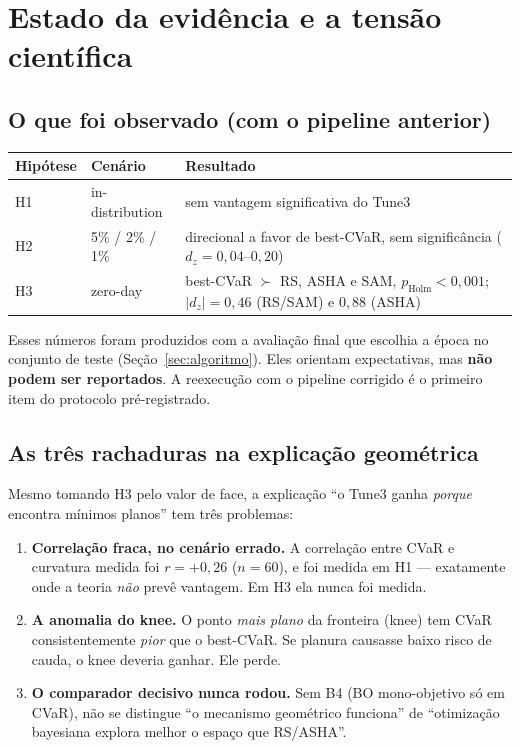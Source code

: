 \section{Estado da evidência e a tensão científica}\label{sec:evidencia}

\subsection{O que foi observado (com o pipeline anterior)}
\begin{center}\small
\begin{tabular}{@{}llp{8.2cm}@{}}
\toprule
Hipótese & Cenário & Resultado \\ \midrule
H1 & in-distribution & sem vantagem significativa do Tune3 \\
H2 & 5\% / 2\% / 1\% & direcional a favor de best-CVaR, sem significância ($d_z=0{,}04$--$0{,}20$) \\
H3 & zero-day & best-CVaR $\succ$ RS, ASHA e SAM, $p_{\text{Holm}}<0{,}001$; $|d_z|=0{,}46$ (RS/SAM) e $0{,}88$ (ASHA) \\
\bottomrule
\end{tabular}
\end{center}
\begin{alerta}[Validade]
Esses números foram produzidos com a avaliação final que escolhia a época no conjunto de teste (Seção~\ref{sec:algoritmo}). Eles orientam expectativas, mas \textbf{não podem ser reportados}. A reexecução com o pipeline corrigido é o primeiro item do protocolo pré-registrado.
\end{alerta}

\subsection{As três rachaduras na explicação geométrica}
Mesmo tomando H3 pelo valor de face, a explicação ``o Tune3 ganha \emph{porque} encontra mínimos planos'' tem três problemas:
\begin{enumerate}
\item \textbf{Correlação fraca, no cenário errado.} A correlação entre CVaR e curvatura medida foi $r=+0{,}26$ ($n=60$), e foi medida em H1 --- exatamente onde a teoria \emph{não} prevê vantagem. Em H3 ela nunca foi medida.
\item \textbf{A anomalia do knee.} O ponto \emph{mais plano} da fronteira (knee) tem CVaR consistentemente \emph{pior} que o best-CVaR. Se planura causasse baixo risco de cauda, o knee deveria ganhar. Ele perde.
\item \textbf{O comparador decisivo nunca rodou.} Sem B4 (BO mono-objetivo só em CVaR), não se distingue ``o mecanismo geométrico funciona'' de ``otimização bayesiana explora melhor o espaço que RS/ASHA''.
\end{enumerate}

